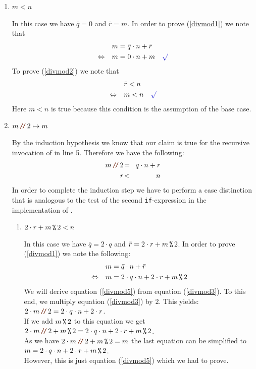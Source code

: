 \begin{enumerate}
\item[B.C.:] $m < n$

  In this case we have $\bar{q} = 0$ and $\bar{r} = m$.
  In order to prove (\ref{divmod1}) we note that 
  \begin{align*}
                    & m = \bar{q} \cdot n + \bar{r} \\
    \Leftrightarrow\quad & m = 0 \cdot n + m \quad \green{\surd}
  \end{align*}
  To prove (\ref{divmod2}) we note that
  \begin{align*}
                         & \bar{r} < n \\
    \Leftrightarrow\quad & m < n \quad\green{\surd}
  \end{align*}
  Here $m < n$ is true because this condition is the assumption of the base case.
\item[I.S.:] $m \dv 2 \mapsto m$

  By the induction hypothesis we know that our claim is true for the recursive invocation of  in
  line 5.  Therefore we have the following:
  \begin{eqnarray}
    m \dv 2 &\!=\! & q \cdot n + r \label{divmod3} \\
          r &\!<\! & n             \label{divmod4}
  \end{eqnarray}
  In order to complete the induction step we have to perform a case distinction that is analogous to the test
  of the second \texttt{if}-expression in the implementation of .
  \begin{enumerate}
  \item $2 \cdot r + m \,\texttt{\%}\, 2 < n$

    In this case we have $\bar{q} = 2 \cdot q$ and $\bar{r} = 2 \cdot r + m \,\texttt{\%}\, 2$.
    In order to prove (\ref{divmod1}) we note the following:
    \begin{align}
                           &  m = \bar{q} \cdot n + \bar{r} \\
      \Leftrightarrow\quad & m = 2 \cdot q \cdot n + 2 \cdot r + m \,\texttt{\%}\, 2 \label{divmod5}
    \end{align}
    We will derive equation (\ref{divmod5}) from equation (\ref{divmod3}).  To this end, we multiply equation
    (\ref{divmod3}) by $2$.  This yields:
    \\[0.2cm]
    \hspace*{1.3cm}
    $2 \cdot m \dv 2 = 2 \cdot q \cdot n + 2 \cdot r$.
    \\[0.2cm]
    If we add $m \,\texttt{\%}\, 2$ to this equation we get
    \\[0.2cm]
    \hspace*{1.3cm}
    $2 \cdot m \dv 2 + m \mmod 2 = 2 \cdot q \cdot n + 2 \cdot r + m \mmod 2$.
    \\[0.2cm]
    As we have $2 \cdot m \dv 2 + m \mmod 2 = m$ the last equation can be simplified to
    \\[0.2cm]
    \hspace*{1.3cm}
    $m = 2 \cdot q \cdot n + 2 \cdot r + m \,\texttt{\%}\, 2$.
    \\[0.2cm]
    However, this is just equation (\ref{divmod5}) which we had to prove. \mycheck


\end{enumerate}
\end{enumerate}
